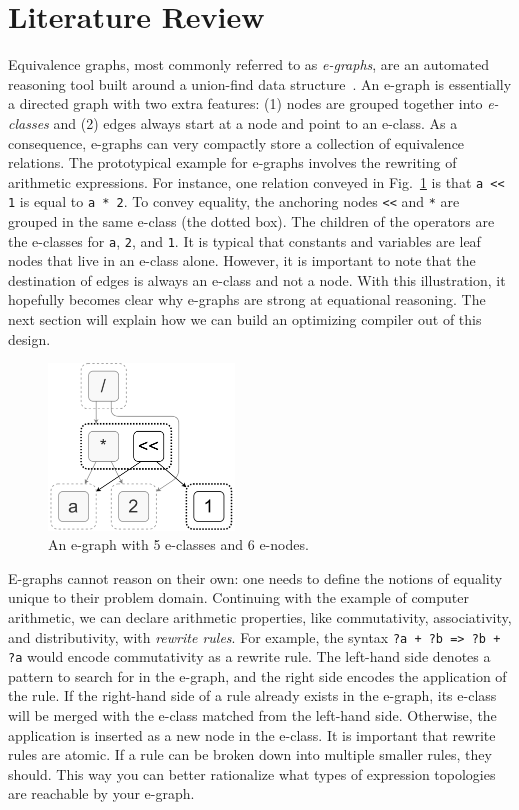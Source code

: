 \documentclass[10pt,letterpaper]{article}
\begin{document}
\section{Literature Review}\label{sec:background}

Equivalence graphs, most commonly referred to as \textit{e-graphs}, are an
automated reasoning tool built around a union-find data
structure~\cite{eggpaper}. An e-graph is essentially a directed graph with two
extra features: (1) nodes are grouped together into \textit{e-classes} and (2)
edges always start at a node and point to an e-class. As a consequence,
e-graphs can very compactly store a collection of equivalence relations. The
prototypical example for e-graphs involves the rewriting of arithmetic
expressions. For instance, one relation conveyed in Fig.~\ref{fig:egraph} is
that \texttt{a << 1} is equal to \texttt{a * 2}. To convey equality, the
anchoring nodes \texttt{<<} and \texttt{*} are grouped in the same e-class (the
dotted box). The children of the operators are the e-classes for \texttt{a},
\texttt{2}, and \texttt{1}. It is typical that constants and variables are leaf
nodes that live in an e-class alone. However, it is important to note that the
destination of edges is always an e-class and not a node. With this
illustration, it hopefully becomes clear why e-graphs are strong at equational
reasoning. The next section will explain how we can build an optimizing
compiler out of this design.

\begin{figure}
    \centering
    \includegraphics[width=0.44\textwidth]{img/egraph.png}
    \caption{An e-graph with 5 e-classes and 6 e-nodes.}\label{fig:egraph}
\end{figure}

E-graphs cannot reason on their own: one needs to define the notions of
equality unique to their problem domain. Continuing with the example of
computer arithmetic, we can declare arithmetic properties, like commutativity,
associativity, and distributivity, with \textit{rewrite rules}. For example,
the syntax \texttt{?a + ?b => ?b + ?a} would encode commutativity as a rewrite
rule. The left-hand side denotes a pattern to search for in the e-graph, and
the right side encodes the application of the rule. If the right-hand side of a
rule already exists in the e-graph, its e-class will be merged with the e-class
matched from the left-hand side. Otherwise, the application is inserted as a
new node in the e-class. It is important that rewrite rules are atomic. If a
rule can be broken down into multiple smaller rules, they should. This way you
can better rationalize what types of expression topologies are reachable by
your e-graph.
\end{document}
